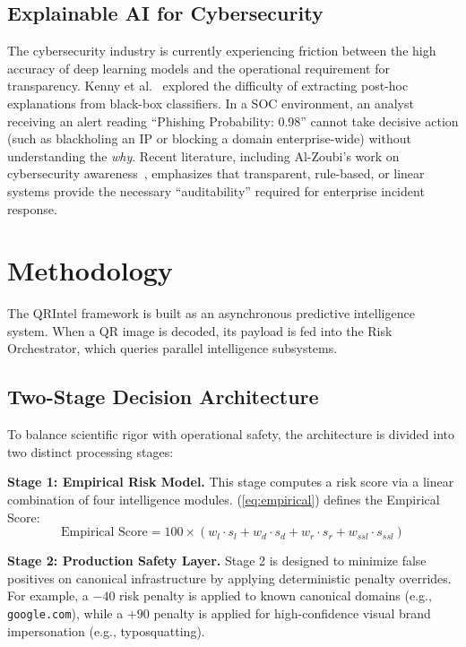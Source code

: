 \documentclass[10pt,twocolumn,letterpaper]{article}
\begin{document}
\subsection{Explainable AI for Cybersecurity}
The cybersecurity industry is currently experiencing friction between the high accuracy of deep learning models and the operational requirement for transparency. Kenny et al.~\cite{Kenny2021} explored the difficulty of extracting post-hoc explanations from black-box classifiers. In a SOC environment, an analyst receiving an alert reading ``Phishing Probability: 0.98'' cannot take decisive action (such as blackholing an IP or blocking a domain enterprise-wide) without understanding the \textit{why}. Recent literature, including Al-Zoubi's work on cybersecurity awareness~\cite{AlZoubi2023}, emphasizes that transparent, rule-based, or linear systems provide the necessary ``auditability'' required for enterprise incident response.

\section{Methodology}

The QRIntel framework is built as an asynchronous predictive intelligence system. When a QR image is decoded, its payload is fed into the Risk Orchestrator, which queries parallel intelligence subsystems.

\subsection{Two-Stage Decision Architecture}
To balance scientific rigor with operational safety, the architecture is divided into two distinct processing stages:

\textbf{Stage 1: Empirical Risk Model.} This stage computes a risk score via a linear combination of four intelligence modules. (\ref{eq:empirical}) defines the Empirical Score:
\begin{equation} \label{eq:empirical}
\text{Empirical Score} = 100 \times (w_l \cdot s_l + w_d \cdot s_d + w_r \cdot s_r + w_{ssl} \cdot s_{ssl})
\end{equation}

\textbf{Stage 2: Production Safety Layer.} Stage 2 is designed to minimize false positives on canonical infrastructure by applying deterministic penalty overrides. For example, a $-40$ risk penalty is applied to known canonical domains (e.g., \texttt{google.com}), while a $+90$ penalty is applied for high-confidence visual brand impersonation (e.g., typosquatting).
\end{document}
